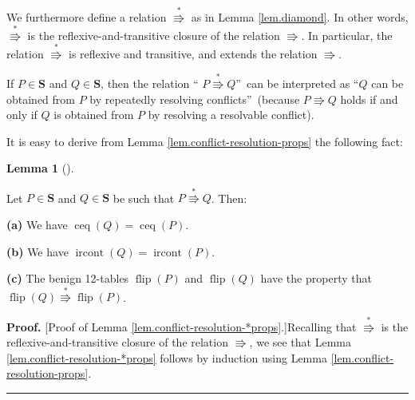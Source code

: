 \documentclass[numbers=enddot,12pt,final,onecolumn,notitlepage]{scrartcl}%
\theoremstyle{definition}
\newtheorem{lem}[theo]{Lemma}
\newenvironment{lemma}[1][]
{\begin{lem}[#1]\begin{leftbar}}
{\end{leftbar}\end{lem}}
\newenvironment{proof}[1][Proof]{\noindent\textbf{#1.} }{\ \rule{0.5em}{0.5em}}
\newenvironment{vershort}{}{}
\begin{document}
We furthermore define a relation $\overset{\ast}{\Rrightarrow}$ as in Lemma
\ref{lem.diamond}. In other words, $\overset{\ast}{\Rrightarrow}$ is the
reflexive-and-transitive closure of the relation $\Rrightarrow$. In
particular, the relation $\overset{\ast}{\Rrightarrow}$ is reflexive and
transitive, and extends the relation $\Rrightarrow$.

If $P\in\mathbf{S}$ and $Q\in\mathbf{S}$, then the relation \textquotedblleft%
$P\overset{\ast}{\Rrightarrow}Q$\textquotedblright\ can be interpreted as
\textquotedblleft$Q$ can be obtained from $P$ by repeatedly resolving
conflicts\textquotedblright\ (because $P\Rrightarrow Q$ holds if and only if
$Q$ is obtained from $P$ by resolving a resolvable conflict).

It is easy to derive from Lemma \ref{lem.conflict-resolution-props} the
following fact:

\begin{lemma}
\label{lem.conflict-resolution-*props}Let $P\in\mathbf{S}$ and $Q\in
\mathbf{S}$ be such that $P\overset{\ast}{\Rrightarrow}Q$. Then:

\textbf{(a)} We have $\operatorname*{ceq}\left(  Q\right)
=\operatorname*{ceq}\left(  P\right)  $.

\textbf{(b)} We have $\operatorname*{ircont}\left(  Q\right)
=\operatorname*{ircont}\left(  P\right)  $.

\textbf{(c)} The benign 12-tables $\operatorname*{flip}\left(  P\right)  $ and
$\operatorname*{flip}\left(  Q\right)  $ have the property that
$\operatorname*{flip}\left(  Q\right)  \overset{\ast}{\Rrightarrow
}\operatorname*{flip}\left(  P\right)  $.
\end{lemma}

\begin{vershort}
\begin{proof}
[Proof of Lemma \ref{lem.conflict-resolution-*props}.]Recalling that
$\overset{\ast}{\Rrightarrow}$ is the reflexive-and-transitive closure of the
relation $\Rrightarrow$, we see that Lemma
\ref{lem.conflict-resolution-*props} follows by induction using Lemma
\ref{lem.conflict-resolution-props}.
\end{proof}
\end{vershort}
\end{document}
